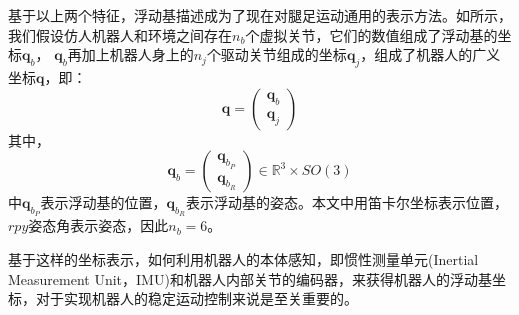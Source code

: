 基于以上两个特征，浮动基描述成为了现在对腿足运动通用的表示方法。如所示，我们假设仿人机器人和环境之间存在$n_b$个虚拟关节，它们的数值组成了浮动基的坐标$\boldsymbol{q}_b$，
$\boldsymbol{q}_b$再加上机器人身上的$n_j$个驱动关节组成的坐标$\boldsymbol{q}_j$，组成了机器人的广义坐标$\boldsymbol{q}$，即：
\begin{equation}
    \label{equ:general_coor}
    \boldsymbol{q}=\left(\begin{array}{c}
        \boldsymbol{q}_b \\
        \boldsymbol{q}_j
        \end{array}\right)
\end{equation}
其中，
\begin{equation}
    \label{equ:floating_coor}
    \boldsymbol{q}_b=\left(\begin{array}{c}
        \boldsymbol{q}_{b_P} \\
        \boldsymbol{q}_{b_R}
        \end{array}\right) \in \mathbb{R}^3 \times SO(3)
\end{equation}
中$ \boldsymbol{q}_{b_P}$表示浮动基的位置，$\boldsymbol{q}_{b_R}$表示浮动基的姿态。本文中用笛卡尔坐标表示位置，$rpy$姿态角表示姿态，因此$n_b = 6$。

基于这样的坐标表示，如何利用机器人的本体感知，即惯性测量单元(Inertial Measurement Unit，IMU)和机器人内部关节的编码器，来获得机器人的浮动基坐标，对于实现机器人的稳定运动控制来说是至关重要的。

